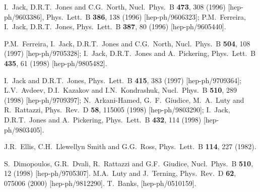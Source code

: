 \documentclass[12pt]{article}
\begin{document}
\begin{thebibliography}{999}
I.~Jack, D.R.T.~Jones and C.G.~North,
  Nucl.\ Phys.\ B {\bf 473}, 308 (1996)
  [hep-ph/9603386],
  Phys.\ Lett.\ B {\bf 386}, 138 (1996)
  [hep-ph/9606323];
P.M.~Ferreira, I.~Jack, D.R.T.~Jones,
  Phys.\ Lett.\ B {\bf 387}, 80 (1996)
  [hep-ph/9605440].

P.M.~Ferreira, I.~Jack, D.R.T.~Jones and C.G.~North,
  Nucl.\ Phys.\ B {\bf 504}, 108 (1997)
  [hep-ph/9705328];
I.~Jack, D.R.T.~Jones and A.~Pickering,
  Phys.\ Lett.\ B {\bf 435}, 61 (1998)
  [hep-ph/9805482].

I.~Jack and D.R.T.~Jones,
  Phys.\ Lett.\ B {\bf 415}, 383 (1997)
  [hep-ph/9709364];
L.V.~Avdeev, D.I.~Kazakov and I.N.~Kondrashuk,
  Nucl.\ Phys.\ B {\bf 510}, 289 (1998)
  [hep-ph/9709397];
N.~Arkani-Hamed, G.~F.~Giudice, M.~A.~Luty and R.~Rattazzi,
  Phys.\ Rev.\ D {\bf 58}, 115005 (1998)
  [hep-ph/9803290];
I.~Jack, D.R.T.~Jones and A.~Pickering,
  Phys.\ Lett.\ B {\bf 432}, 114 (1998)
  [hep-ph/9803405].

  J.R.~Ellis, C.H.~Llewellyn Smith and G.G.~Ross,
  Phys.\ Lett.\  B {\bf 114}, 227 (1982).

  S.~Dimopoulos, G.R.~Dvali, R.~Rattazzi and G.F.~Giudice,
  Nucl.\ Phys.\  B {\bf 510}, 12 (1998)
  [hep-ph/9705307].
%
  M.A.~Luty and J.~Terning,
  Phys.\ Rev.\  D {\bf 62}, 075006 (2000)
  [hep-ph/9812290].
%
  T.~Banks,
  [hep-ph/0510159].


\end{thebibliography}
\end{document}
